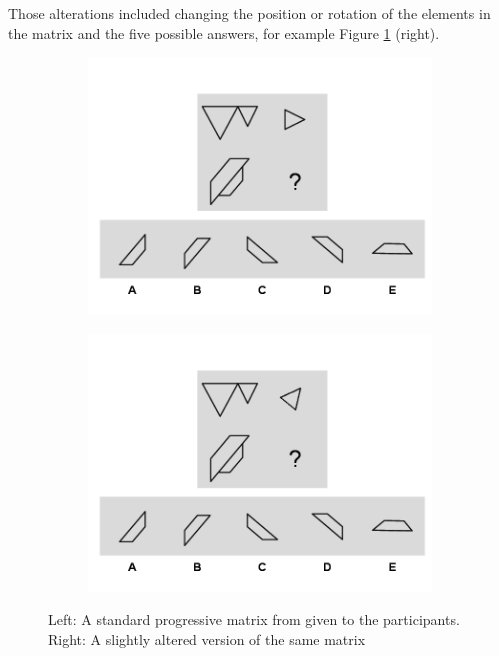 Those alterations included changing the position or rotation of the elements in the matrix and the five possible answers, for example Figure \ref{fig:figureMatrices} (right).
\begin{figure}[H]
  \centering
  \begin{subfigure}[t]{0.45\textwidth}
    \includegraphics[width=\textwidth]{img/q-17.png}
  \end{subfigure}
  \hspace{5mm}
  \begin{subfigure}[t]{0.45\textwidth}
    \includegraphics[width=\textwidth]{img/q-57.png}
  \end{subfigure}
  \caption{Left: A standard progressive matrix from \textcite{albuquerqueDoesGenderStereotype2017} given to the participants. Right: A slightly altered version of the same matrix}
  \label{fig:figureMatrices}
\end{figure}
